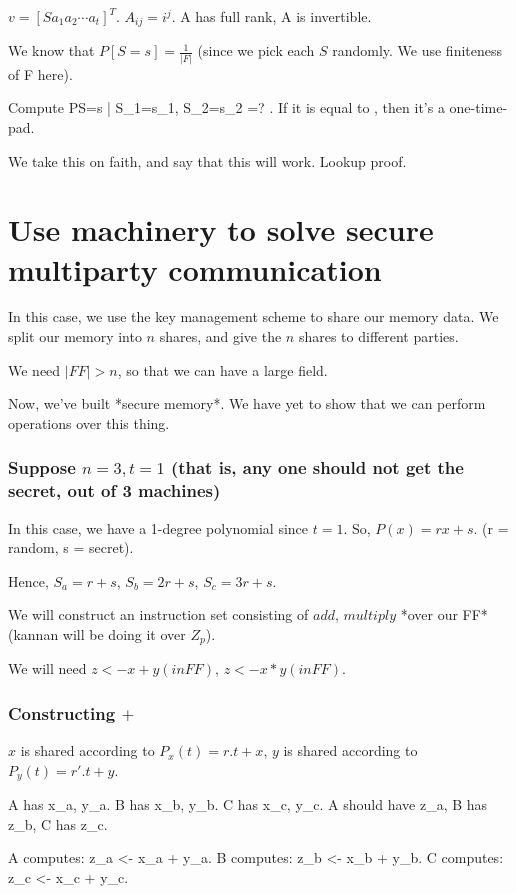 $v = [S a_1 a_2 \cdots a_t]^T$.
$A_{ij} = i^j $. A has full rank, A is invertible.

We know that $P[S=s] = \frac{1}{|F|}$ (since we pick each $S$ randomly. We use finiteness of F here).

Compute P{S=s | S_1=s_1, S_2=s_2} =? . If it is equal to , then it's a one-time-pad.

We take this on faith, and say that this will work. Lookup proof.


\section{Use machinery to solve secure multiparty communication}
In this case, we use the key management scheme to share our memory data.
We split our memory into $n$ shares, and give the $n$ shares to different parties.

We need $|FF| > n$, so that we can have a large field.

Now, we've built *secure memory*. We have yet to show that we can perform operations over this thing.

\subsubsection{Suppose $n = 3, t = 1$ (that is, any one should not get the secret, out of 3 machines)}


In this case, we have a 1-degree polynomial since $t = 1$. So, $P(x) = rx + s$.
(r = random, s = secret).

Hence, $S_a = r + s$, $S_b = 2r + s$, $S_c = 3r + s$.

We will construct an instruction set consisting of $add$, $multiply$ *over our FF* (kannan will be doing it over $Z_p$).

We will need $z <- x + y (in FF)$, $z <- x * y (in FF)$.


\subsubsection{Constructing $+$}

$x$ is shared according to $P_x(t) = r.t + x$,
$y$ is shared according to $P_y(t) = r'.t + y$.

A has x_a, y_a. B has x_b, y_b. C has x_c, y_c.
A should have z_a, B has z_b, C has z_c.

A computes: z_a <- x_a + y_a.
B computes: z_b <- x_b + y_b.
C computes: z_c <- x_c + y_c.

